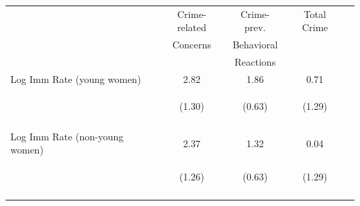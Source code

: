 \begin{center}
\begin{tabular}{lcccc}
\hline \noalign{\smallskip} & Crime-related & Crime-prev. & Total Crime & \\
 & Concerns & Behavioral  &  & \\
 &  & Reactions &  & \\
\noalign{\smallskip}\hline \noalign{\smallskip}Log Imm Rate (young women) & 2.82 & 1.86 & 0.71 & \\
 & \begin{footnotesize}(1.30)\end{footnotesize} & \begin{footnotesize}(0.63)\end{footnotesize} & \begin{footnotesize}(1.29)\end{footnotesize} & \begin{footnotesize}\end{footnotesize}\\
 & \begin{footnotesize}[0.033]\end{footnotesize} & \begin{footnotesize}[0.004]\end{footnotesize} & \begin{footnotesize}[0.583]\end{footnotesize} & \begin{footnotesize}\end{footnotesize}\\
\noalign{\smallskip}Log Imm Rate (non-young women) & 2.37 & 1.32 & 0.04 & \\
 & \begin{footnotesize}(1.26)\end{footnotesize} & \begin{footnotesize}(0.63)\end{footnotesize} & \begin{footnotesize}(1.29)\end{footnotesize} & \begin{footnotesize}\end{footnotesize}\\
 & \begin{footnotesize}[0.062]\end{footnotesize} & \begin{footnotesize}[0.039]\end{footnotesize} & \begin{footnotesize}[0.978]\end{footnotesize} & \begin{footnotesize}\end{footnotesize}\\

\end{tabular}
\end{center}
